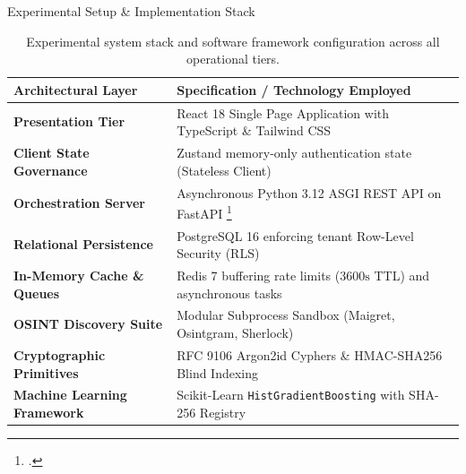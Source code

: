 \documentclass[aspectratio=169,10pt]{beamer}
\begin{document}
\begin{frame}{Experimental Setup \& Implementation Stack}
  \begin{table}
    \centering
    \footnotesize
    \begin{tabular}{>{\raggedright\arraybackslash}p{4.2cm} >{\raggedright\arraybackslash}p{7.8cm}}
      \toprule
      \textbf{Architectural Layer} & \textbf{Specification / Technology Employed} \\
      \midrule
      \textbf{Presentation Tier} & React 18 Single Page Application with TypeScript \& Tailwind CSS \\
      \textbf{Client State Governance} & Zustand memory-only authentication state (Stateless Client) \\
      \textbf{Orchestration Server} & Asynchronous Python 3.12 ASGI REST API on FastAPI \footcite{fastapi2025} \\
      \textbf{Relational Persistence} & PostgreSQL 16 enforcing tenant Row-Level Security (RLS) \\
      \textbf{In-Memory Cache \& Queues} & Redis 7 buffering rate limits ($3600\text{s}$ TTL) and asynchronous tasks \\
      \textbf{OSINT Discovery Suite} & Modular Subprocess Sandbox (Maigret, Osintgram, Sherlock) \\
      \textbf{Cryptographic Primitives} & RFC 9106 Argon2id Cyphers \& HMAC-SHA256 Blind Indexing \\
      \textbf{Machine Learning Framework} & Scikit-Learn \texttt{HistGradientBoosting} with SHA-256 Registry \\
      \bottomrule
    \end{tabular}
    \caption{Experimental system stack and software framework configuration across all operational tiers.}
  \end{table}
\end{frame}
\end{document}
